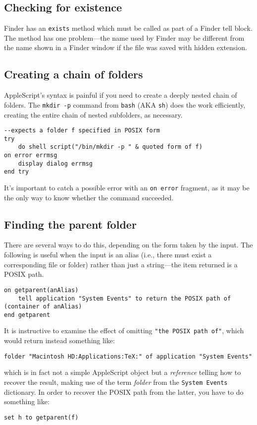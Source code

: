 \documentclass[11pt]{amsart}
\begin{document}
\subsection{Checking for existence}
Finder has an {\tt exists} method which must be called as part of a Finder tell block. The method has one problem---the name used by Finder may be different from the name shown in a Finder window if the file was saved with hidden extension. 
\subsection{Creating a chain of folders}
AppleScript's syntax is painful if you need to create a deeply nested chain of folders. The {\tt mkdir -p} command from {\tt bash} (AKA {\tt sh}) does the work efficiently, creating the entire chain of nested subfolders, as necessary.
\begin{verbatim}
--expects a folder f specified in POSIX form
try
    do shell script("/bin/mkdir -p " & quoted form of f)
on error errmsg
    display dialog errmsg
end try
\end{verbatim}
It's important to catch a possible error with an {\tt on error} fragment, as it may be the only way to know whether the command succeeded.
\subsection{Finding the parent folder}
There are several ways to do this, depending on the form taken by the input. The following is useful when the input is an alias (i.e., there must exist a corresponding file or folder) rather than just a string---the item returned is a POSIX path.
\begin{verbatim}
on getparent(anAlias)
    tell application "System Events" to return the POSIX path of (container of anAlias)
end getparent
\end{verbatim}
It is instructive to examine the effect of omitting \verb|"the POSIX path of"|, which would return instead something like:
\begin{verbatim}
folder "Macintosh HD:Applications:TeX:" of application "System Events"
\end{verbatim}
which is in fact not a simple AppleScript object but a \emph{reference} telling how to recover the result, making use of the term \emph{folder} from the {\tt System Events} dictionary. In order to recover the POSIX path from the latter, you have to do something like:
\begin{verbatim}
set h to getparent(f)
\end{verbatim}
\end{document}

